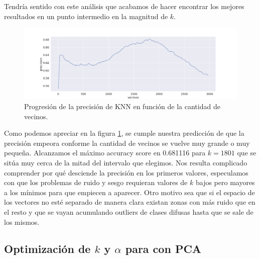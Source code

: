 Tendría sentido con este análisis que acabamos de hacer encontrar los mejores resultados en un punto intermedio en la magnitud de $k$.

\begin{figure}[h]
\includegraphics[width=\textwidth]{./img/knn.png}
\centering
\caption{Progresión de la precisión de KNN en función de la cantidad de vecinos.\label{fig:knn_acc}}

\end{figure}

Como podemos apreciar en la figura \ref{fig:knn_acc}, se cumple nuestra predicción de que la precisión empeora conforme la cantidad de vecinos se vuelve muy grande o muy pequeña. Alcanzamos el máximo accuracy score en 0.681116 para $k=1801$ que se sitúa muy cerca de la mitad del intervalo que elegimos. Nos resulta complicado comprender por qué desciende la precisión en los primeros valores, especulamos con que los problemas de ruido y sesgo requieran valores de $k$ bajos pero mayores a los mínimos para que empiecen a aparecer. Otro motivo sea que si el espacio de los vectores no esté separado de manera clara existan zonas con más ruido que en el resto y que se vayan acumulando outliers de clases difusas hasta que se sale de los mismos.

\subsection{Optimización de $k$ y $\alpha$ para \knn{} con PCA}%
\label{sub:alpha_k_knn_pca}
